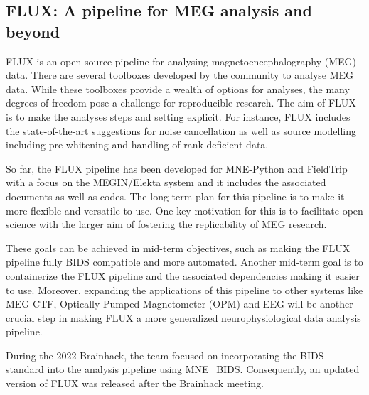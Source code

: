 \documentclass[../main.tex]{subfiles}
\begin{document}
\subsection{FLUX: A pipeline for MEG analysis and beyond}\label{sec:FLUX}


FLUX\supercite{Ferrante2022} is an open-source pipeline for analysing magnetoencephalography (MEG) data. There are several toolboxes developed by the community to analyse MEG data. While these toolboxes provide a wealth of options for analyses, the many degrees of freedom pose a challenge for reproducible research. The aim of FLUX is to make the analyses steps and setting explicit. For instance, FLUX includes the state-of-the-art suggestions for noise cancellation as well as source modelling including pre-whitening and handling of rank-deficient data.

So far, the FLUX pipeline has been developed for MNE-Python\supercite{Gramfort2014} and FieldTrip\supercite{Oostenveld2011} with a focus on the MEGIN/Elekta system and it includes the associated documents as well as codes.
The long-term plan for this pipeline is to make it more flexible and versatile to use. One key motivation for this is to facilitate open science with the larger aim of fostering the replicability of MEG research.

These goals can be achieved in mid-term objectives, such as making the FLUX pipeline fully BIDS compatible and more automated. Another mid-term goal is to containerize the FLUX pipeline and the associated dependencies making it easier to use. Moreover, expanding the applications of this pipeline to other systems like MEG CTF, Optically Pumped Magnetometer (OPM) and EEG will be another crucial step in making FLUX a more generalized neurophysiological data analysis pipeline.

During the 2022 Brainhack, the team focused on incorporating the BIDS standard into the analysis pipeline using MNE_BIDS\supercite{Appelhoff2019}. Consequently, an updated version of FLUX was released after the Brainhack meeting.
\end{document}
